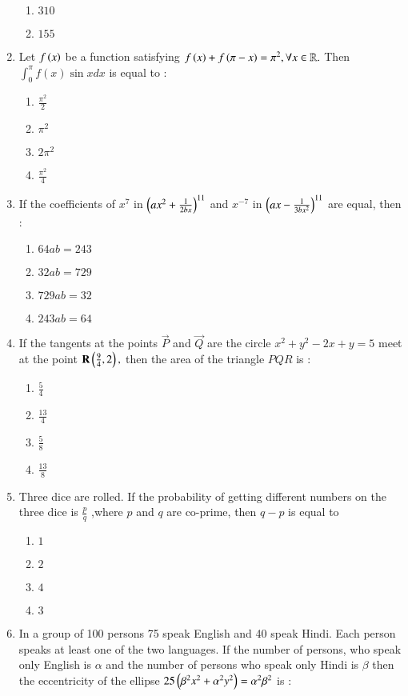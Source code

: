\documentclass[journal,12pt,onecolumn]{IEEEtran}
\theoremstyle{remark}
\begin{document}
\begin{enumerate}
\begin{enumerate}
        \item $310$     
        \item $155$     
    \end{enumerate}
\item Let $f\left(x\right)$ be a function satisfying $f\left(x\right)+f\left(\pi -x\right)=\pi ^2,\forall x \in \mathbb{R}.$ Then $\int_0^{\pi} f(x) \sin x dx$ is equal to :
        \begin{enumerate}
        \item $\frac{\pi ^2}{2}$
        \item $\pi ^2$
        \item $2\pi ^2$
        \item $\frac{\pi ^2}{4}$
    \end{enumerate}
\item If the coefficients of $x^7$ in $\left( ax^2 + \frac{1}{2bx}\right)^{11}$ and $x^{-7}$ in $\left(ax - \frac{1}{3bx^2}\right)^{11}$ are equal, then :               
\begin{enumerate}
        \item $64 ab = 243$
        \item $32 ab = 729$
        \item $729 ab = 32$
        \item $243 ab = 64$
    \end{enumerate}
\item If the tangents at the points $\vec{P}$ and $\vec{Q}$ are the circle $ x^2 + y^2 -2x + y = 5 $ meet at the point $\mathbf{R} \left( \frac{9}{4},2\right) ,$ then the area of the triangle $PQR$ is :
\begin{enumerate}                  
        \item $\frac{5}{4}$    
        \item $\frac{13}{4}$
        \item $\frac{5}{8}$
        \item $\frac{13}{8}$
\end{enumerate}
\item Three dice are rolled. If the probability of getting different numbers on the three dice is
$\frac{p}{q}$ ,where $p$ and $q$ are co-prime, then $q-p$ is equal to 
        \begin{enumerate}
        \item $1$ 
        \item $2$
        \item $4$ 
        \item $3$
    \end{enumerate}
\item In a group of 100 persons 75 speak English and 40 speak Hindi. Each person speaks at least one of the two languages. If the number of persons, who speak only English is $\alpha$ and the number of persons who speak only Hindi is $\beta $ then the eccentricity of the ellipse $25 \left(\beta ^2 x^2 +\alpha ^2 y^2\right) = \alpha ^2 \beta ^2$ is :

\end{enumerate}
\end{document}
